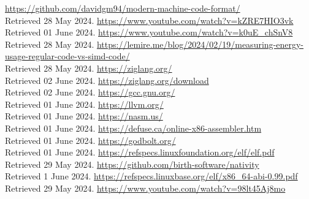 \documentclass[12pt]{article}
\begin{document}
	\newpage
	\begin{thebibliography}{9}
		 \href{https://github.com/davidgm94/modern-machine-code-format/}{https://github.com/davidgm94/modern-machine-code-format/}\\
		Retrieved 28 May 2024.
		\href{https://www.youtube.com/watch?v=kZRE7HIO3vk}{https://www.youtube.com/watch?v=kZRE7HIO3vk}\\
		Retrieved 01 June 2024.
		\href{https://www.youtube.com/watch?v=k0uE_chSnV8}{https://www.youtube.com/watch?v=k0uE\_chSnV8}\\
		Retrieved 28 May 2024.
		\href{https://lemire.me/blog/2024/02/19/measuring-energy-usage-regular-code-vs-simd-code}{https://lemire.me/blog/2024/02/19/measuring-energy-usage-regular-code-vs-simd-code/}\\
		Retrieved 28 May 2024.
		\href{https://ziglang.org/}{https://ziglang.org/}\\
		Retrieved 02 June 2024.
		\href{https://ziglang.org/download}{https://ziglang.org/download}\\
		Retrieved 02 June 2024.
		\href{https://gcc.gnu.org/}{https://gcc.gnu.org/}\\
		Retrieved 01 June 2024.
		\href{https://llvm.org/}{https://llvm.org/}\\
		Retrieved 01 June 2024.
		\href{https://nasm.us/}{https://nasm.us/}\\
		Retrieved 01 June 2024.
		\href{https://defuse.ca/online-x86-assembler.htm}{https://defuse.ca/online-x86-assembler.htm}\\
		Retrieved 01 June 2024.
		\href{https://godbolt.org/}{https://godbolt.org/}\\
		Retrieved 01 June 2024.
		\href{https://refspecs.linuxfoundation.org/elf/elf.pdf}{https://refspecs.linuxfoundation.org/elf/elf.pdf}\\
		Retrieved 29 May 2024.
		\href{https://github.com/birth-software/nativity}{https://github.com/birth-software/nativity}\\
		Retrieved 1 June 2024.
		\href{https://refspecs.linuxbase.org/elf/x86_64-abi-0.99.pdf}{https://refspecs.linuxbase.org/elf/x86\_64-abi-0.99.pdf}\\
		Retrieved 29 May 2024.
		\href{https://www.youtube.com/watch?v=98lt45Aj8mo}{https://www.youtube.com/watch?v=98lt45Aj8mo}\\

\end{thebibliography}
\end{document}
